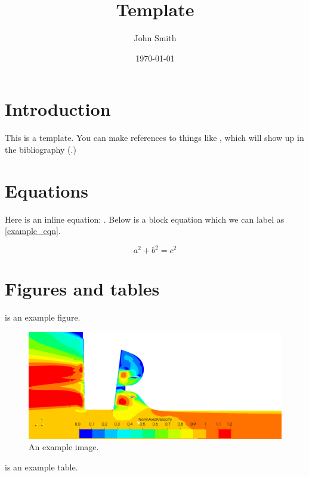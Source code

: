 \documentclass{article}
\title{Template} %
\author{John Smith} %
\date{\today} %
\begin{document}

	\maketitle %
    
	\section{Introduction}
	This is a template. You can make references to things like \citep{latexsource}, which will show up in the bibliography (.)

	\section{Equations}
	Here is an inline equation: . Below is a block equation which we can label as \eqref{example_eqn}.

	\begin{equation} 
		\label{example_eqn}
		a^2+b^2=c^2
	\end{equation}

	\section{Figures and tables}
	 is an example figure. 

	\begin{figure}[h!]
  		\includegraphics[width=\linewidth]{images/example.png}
  		\caption{An example image.}
  		\label{figtest}
	\end{figure}


	 is an example table.
\end{document}
